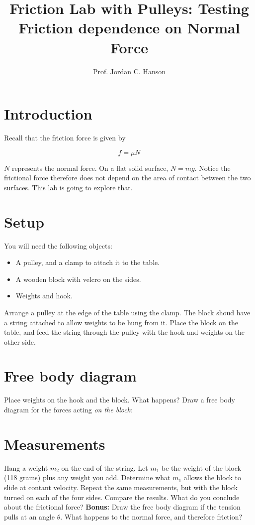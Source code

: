 \documentclass{article}
\begin{document}
\title{Friction Lab with Pulleys: Testing Friction dependence on Normal Force}
\author{Prof. Jordan C. Hanson}

\maketitle

\section{Introduction}

Recall that the friction force is given by

\begin{equation}
f = \mu N
\end{equation}

$N$ represents the normal force.  On a flat solid surface, $N = mg$.  Notice the frictional force therefore does not depend on the area of contact between the two surfaces.  This lab is going to explore that.

\section{Setup}

You will need the following objects:

\begin{itemize}
\item A pulley, and a clamp to attach it to the table.
\item A wooden block with velcro on the sides.
\item Weights and hook.
\end{itemize}

Arrange a pulley at the edge of the table using the clamp.  The block shoud have a string attached to allow weights to be hung from it.  Place the block on the table, and feed the string through the pulley with the hook and weights on the other side.

\section{Free body diagram}

Place weights on the hook and the block.  What happens?  Draw a free body diagram for the forces acting \textit{on the block}: \\ \vspace{1cm}

\section{Measurements}

Hang a weight $m_2$ on the end of the string.  Let $m_1$ be the weight of the block (118 grams) plus any weight you add.  Determine what $m_1$ allows the block to slide at contant velocity.  Repeat the same measurements, but with the block turned on each of the four sides.  Compare the results.  What do you conclude about the frictional force? \textbf{Bonus:} Draw the free body diagram if the tension pulls at an angle $\theta$.  What happens to the normal force, and therefore friction?\\ \vspace{3cm}
\end{document}
